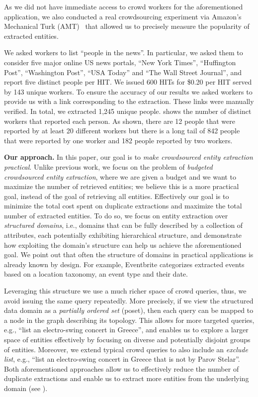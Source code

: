 As we did not have immediate access to crowd workers for the aforementioned application, we also conducted a real crowdsourcing experiment via Amazon's Mechanical Turk (AMT)~\cite{mturk} that allowed us to precisely measure the popularity of extracted entities. 

\begin{example}
We asked workers to list ``people in the news''. In particular, we asked them to consider five major online US news portals, ``New York Times'', ``Huffington Post'', ``Washington Post'', ``USA  Today'' and ``The Wall Street Journal'', and report five distinct people per HIT. We issued 600 HITs for \$0.20 per HIT served by 143 unique workers. To ensure the accuracy of our results we asked workers to provide us with a link corresponding to the extraction. These links were manually verified.  In total, we extracted 1,245 unique people.  shows the number of distinct workers that reported each person. As shown, there are 12 people that were reported by at least 20 different workers but there is a long tail of 842 people that were reported by one worker and 182 people reported by two workers. 
\end{example}

\noindent\textbf{Our approach.} In this paper, our goal is to {\em make crowdsourced entity extraction practical}. Unlike previous work, we focus on the problem of {\em budgeted crowdsourced entity extraction}, where we are given a budget and we want to maximize the number of retrieved entities; we believe this is a more practical goal, instead of the goal of retrieving all entities.  Effectively our goal is to minimize the total cost spent on duplicate extractions and maximize the total number of extracted entities. To do so, we focus on entity extraction over {\em structured domains}, i.e., domains that can be fully described by a collection of attributes, each potentially exhibiting hierarchical structure, and demonstrate how exploiting the domain's structure can help us achieve the aforementioned goal. We point out that often the structure of domains in practical applications is already known by design. For example, Eventbrite categorizes extracted events based on a location taxonomy, an event type and their date. 

Leveraging this structure we use a much richer space of crowd queries, thus, we avoid issuing the same query repeatedly. More precisely, if we view the structured data domain as a \emph{partially ordered set} (poset), then each query can be mapped to a node in the graph describing its topology. This allows for more targeted queries, e.g., ``list an electro-swing concert in Greece'', and enables us to explore a larger space of entities effectively by focusing on diverse and potentially disjoint groups of entities. Moreover, we extend typical crowd queries to also include an {\em exclude list}, e.g., ``list an electro-swing concert in Greece that is not by Parov Stelar''. Both aforementioned approaches allow us to effectively reduce the number of duplicate extractions and enable us to extract more entities from the underlying domain (see ).

